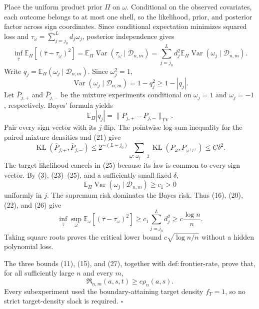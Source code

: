 Place the uniform product prior \(\Pi\) on \(\omega\).  Conditional on the observed covariates, each outcome belongs to at most one shell, so the likelihood, prior, and posterior factor across sign coordinates.  Since conditional expectation minimizes squared loss and \(\tau_\omega=\sum_{j=j_0}^Ld_j\omega_j\), posterior independence gives
\[
 \inf_{\widehat\tau}
 \mathbb E_\Pi[(\widehat\tau-\tau_\omega)^2]
 =
 \mathbb E_\Pi\operatorname{Var}
       (\tau_\omega\mid\mathcal D_{n,m})
 =\sum_{j=j_0}^Ld_j^2
   \mathbb E_\Pi\operatorname{Var}
       (\omega_j\mid\mathcal D_{n,m}).
\tag{22}
\]
Write \(q_j=\mathbb E_\Pi(\omega_j\mid\mathcal D_{n,m})\).  Since \(\omega_j^2=1\),
\[
 \operatorname{Var}(\omega_j\mid\mathcal D_{n,m})
 =1-q_j^2\ge1-|q_j|.
\tag{23}
\]
Let \(\overline P_{j,+}\) and \(\overline P_{j,-}\) be the mixture experiments conditional on \(\omega_j=1\) and \(\omega_j=-1\), respectively.  Bayes' formula yields
\[
 \mathbb E_\Pi|q_j|
 =\|\overline P_{j,+}-\overline P_{j,-}\|_{\mathrm{TV}}.
\tag{24}
\]
Pair every sign vector with its \(j\)-flip.  The pointwise log-sum inequality for the paired mixture densities and (21) give
\[
 \operatorname{KL}(\overline P_{j,+},\overline P_{j,-})
 \le 2^{-(L-j_0)}
 \sum_{\omega:\,\omega_j=1}
 \operatorname{KL}(P_\omega,P_{\omega^{(j)}})
 \le C\delta^2.
\tag{25}
\]
The target likelihood cancels in (25) because its law is common to every sign vector.  By (3), (23)--(25), and a sufficiently small fixed \(\delta\),
\[
 \mathbb E_\Pi\operatorname{Var}
   (\omega_j\mid\mathcal D_{n,m})
 \ge c_1>0
\tag{26}
\]
uniformly in \(j\).  The supremum risk dominates the Bayes risk.  Thus (16), (20), (22), and (26) give
\[
 \inf_{\widehat\tau}\sup_\omega
 \mathbb E_\omega[(\widehat\tau-\tau_\omega)^2]
 \ge c_1\sum_{j=j_0}^Ld_j^2
 \ge c\frac{\log n}{n}.
\tag{27}
\]
Taking square roots proves the critical lower bound \(c\sqrt{\log n/n}\) without a hidden polynomial loss.

The three bounds (11), (15), and (27), together with \(\mathrm{def:frontier\text{-}rate}\), prove that, for all sufficiently large \(n\) and every \(m\),
\[
 \mathfrak R_{n,m}(a,s,t)\ge c\rho_n(a,s).
\]
Every subexperiment used the boundary-attaining target density \(f_T=1\), so no strict target-density slack is required. \(\square\)